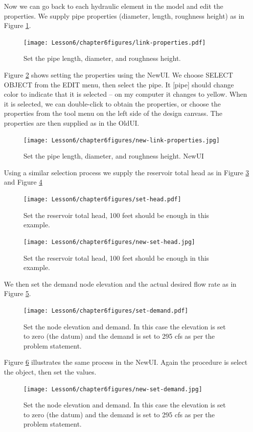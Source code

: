 Now we can go back to each hydraulic element in the model and edit the properties.  We supply pipe properties (diameter, length, roughness height) as in Figure \ref{fig:link-properties}.
\begin{figure}[h!] %
   \centering
   \texttt{[image: Lesson6/chapter6figures/link-properties.pdf]} 
   \caption{Set the pipe length, diameter, and roughness height.}
   \label{fig:link-properties}
\end{figure}
Figure \ref{fig:new-link-properties} shows setting the properties using the NewUI.
We choose SELECT OBJECT from the EDIT menu, then select the pipe.  
It [pipe] should change color to indicate that it is selected -- on my computer it changes to yellow.
When it is selected, we can double-click to obtain the properties, or choose the properties from the tool menu on the left side of the design canvass. The properties are then supplied as in the OldUI.
\begin{figure}[h!] %
   \centering
   \texttt{[image: Lesson6/chapter6figures/new-link-properties.jpg]} 
   \caption{Set the pipe length, diameter, and roughness height.  NewUI}
   \label{fig:new-link-properties}
\end{figure}
\newpage
Using a similar selection process we supply the reservoir total head as in Figure \ref{fig:set-head} and Figure \ref{fig:new-set-head}
\begin{figure}[h!] %
   \centering
   \texttt{[image: Lesson6/chapter6figures/set-head.pdf]} 
   \caption{Set the reservoir total head, 100 feet should be enough in this example.}
   \label{fig:set-head}
\end{figure}
\clearpage
\begin{figure}[h!] %
   \centering
   \texttt{[image: Lesson6/chapter6figures/new-set-head.jpg]} 
   \caption{Set the reservoir total head, 100 feet should be enough in this example.}
   \label{fig:new-set-head}
\end{figure}
We then set the demand node elevation and the actual desired flow rate as in Figure \ref{fig:set-demand}.
\begin{figure}[h!] %
   \centering
   \texttt{[image: Lesson6/chapter6figures/set-demand.pdf]} 
   \caption{Set the node elevation and demand.  In this case the elevation is set to zero (the datum) and the demand is set to 295 cfs as per the problem statement.}
   \label{fig:set-demand}
\end{figure}
Figure \ref{fig:new-set-demand} illustrates the same process in the NewUI.   
\newline Again the procedure is select the object, then set the values.
\begin{figure}[h!] %
   \centering
   \texttt{[image: Lesson6/chapter6figures/new-set-demand.jpg]} 
   \caption{Set the node elevation and demand.  In this case the elevation is set to zero (the datum) and the demand is set to 295 cfs as per the problem statement.}
   \label{fig:new-set-demand}
\end{figure}

